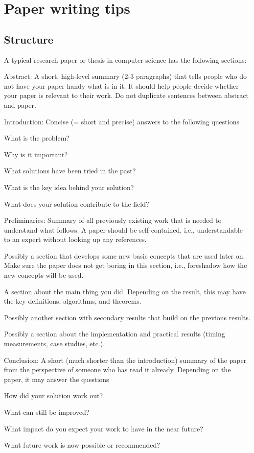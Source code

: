 \documentclass[12pt]{article}
\begin{document}
\section{Paper writing tips}

\subsection{Structure}

A typical research paper or thesis in computer science has the following sections:
\begin{compactitem}
\item Abstract: A short, high-level summary (2-3 paragraphs) that tells people who do not have your paper handy what is in it.
It should help people decide whether your paper is relevant to their work.
Do not duplicate sentences between abstract and paper.
\item Introduction: Concise (= short and precise) answers to the following questions
 \begin{compactitem}
  \item What is the problem?
  \item Why is it important?
  \item What solutions have been tried in the past?
  \item What is the key idea behind your solution?
  \item What does your solution contribute to the field?
 \end{compactitem}
\item Preliminaries: Summary of all previously existing work that is needed to understand what follows.
  A paper should be self-contained, i.e., understandable to an expert without looking up any references.
\item Possibly a section that develops some new basic concepts that are used later on.
Make sure the paper does not get boring in this section, i.e., foreshadow how the new concepts will be used.
\item A section about the main thing you did. Depending on the result, this may have the key definitions, algorithms, and theorems.
\item Possibly another section with secondary results that build on the previous results.
\item Possibly a section about the implementation and practical results (timing measurements, case studies, etc.).
\item Conclusion: A short (much shorter than the introduction) summary of the paper from the perspective of someone who has read it already.
Depending on the paper, it may answer the questions
 \begin{compactitem}
  \item How did your solution work out?
  \item What can still be improved?
  \item What impact do you expect your work to have in the near future?
  \item What future work is now possible or recommended?
 \end{compactitem}
\end{compactitem}
\end{document}
